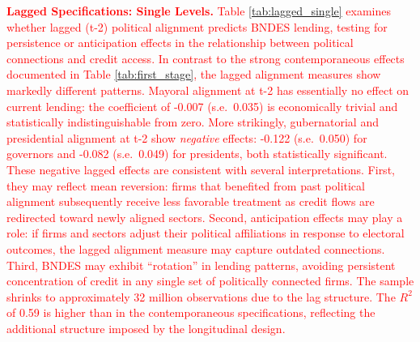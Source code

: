\documentclass{article}
\begin{document}
\begin{table}[H]
\begin{threeparttable}
\begin{tablenotes}
        \end{tablenotes}
    \end{threeparttable}
\end{table}

\textcolor{red}{\textbf{Lagged Specifications: Single Levels.} Table \ref{tab:lagged_single} examines whether lagged (t-2) political alignment predicts BNDES lending, testing for persistence or anticipation effects in the relationship between political connections and credit access. In contrast to the strong contemporaneous effects documented in Table \ref{tab:first_stage}, the lagged alignment measures show markedly different patterns. Mayoral alignment at t-2 has essentially no effect on current lending: the coefficient of -0.007 (s.e.~0.035) is economically trivial and statistically indistinguishable from zero. More strikingly, gubernatorial and presidential alignment at t-2 show \textit{negative} effects: -0.122 (s.e.~0.050) for governors and -0.082 (s.e.~0.049) for presidents, both statistically significant. These negative lagged effects are consistent with several interpretations. First, they may reflect mean reversion: firms that benefited from past political alignment subsequently receive less favorable treatment as credit flows are redirected toward newly aligned sectors. Second, anticipation effects may play a role: if firms and sectors adjust their political affiliations in response to electoral outcomes, the lagged alignment measure may capture outdated connections. Third, BNDES may exhibit ``rotation'' in lending patterns, avoiding persistent concentration of credit in any single set of politically connected firms. The sample shrinks to approximately 32 million observations due to the lag structure. The $R^2$ of 0.59 is higher than in the contemporaneous specifications, reflecting the additional structure imposed by the longitudinal design.}
\end{document}

